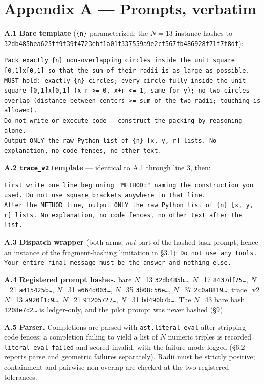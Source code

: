 \documentclass[11pt]{article}
\begin{document}
\appendix
\section*{Appendix A --- Prompts, verbatim}

\textbf{A.1 Bare template} (\texttt{\{n\}} parameterized; the $N = 13$ instance hashes to
\texttt{32db485bea625ff9f39f4723ebf1a01f337559a9e2cf567fb486928f71f7f8df}):

\begin{lstlisting}
Pack exactly {n} non-overlapping circles inside the unit square [0,1]x[0,1] so that the sum of their radii is as large as possible.
MUST hold: exactly {n} circles; every circle fully inside the unit square [0,1]x[0,1] (x-r >= 0, x+r <= 1, same for y); no two circles overlap (distance between centers >= sum of the two radii; touching is allowed).
Do not write or execute code - construct the packing by reasoning alone.
Output ONLY the raw Python list of {n} [x, y, r] lists. No explanation, no code fences, no other text.
\end{lstlisting}

\textbf{A.2 \texttt{trace\_v2} template} --- identical to A.1 through line 3, then:

\begin{lstlisting}
First write one line beginning "METHOD:" naming the construction you used. Do not use square brackets anywhere in that line.
After the METHOD line, output ONLY the raw Python list of {n} [x, y, r] lists. No explanation, no code fences, no other text after the list.
\end{lstlisting}

\textbf{A.3 Dispatch wrapper} (both arms; \textit{not} part of the hashed task prompt, hence an instance of
the fragment-hashing limitation in \S3.1): \texttt{Do not use any tools. Your entire final message must
be the answer and nothing else.}

\textbf{A.4 Registered prompt hashes.} bare $N$=13 \texttt{32db485b\dots}, $N$=17 \texttt{8437df75\dots}, $N$=21 \texttt{a415425b\dots},
$N$=31 \texttt{a664d003\dots}, $N$=35 \texttt{3b08c56e\dots}, $N$=37 \texttt{2c0a8819\dots}; trace\_v2 $N$=13 \texttt{a920f1c9\dots}, $N$=21
\texttt{91205727\dots}, $N$=31 \texttt{bd490b7b\dots}. The $N$=43 bare hash \texttt{1208e7d2\dots} is ledger-only, and the pilot
prompt was never hashed (\S9).

\textbf{A.5 Parser.} Completions are parsed with \texttt{ast.literal\_eval} after stripping code fences; a
completion failing to yield a list of $N$ numeric triples is recorded \texttt{literal\_eval\_failed} and
scored invalid, with the failure mode logged (\S6.2 reports parse and geometric failures
separately). Radii must be strictly positive; containment and pairwise non-overlap are checked
at the two registered tolerances.
\end{document}
